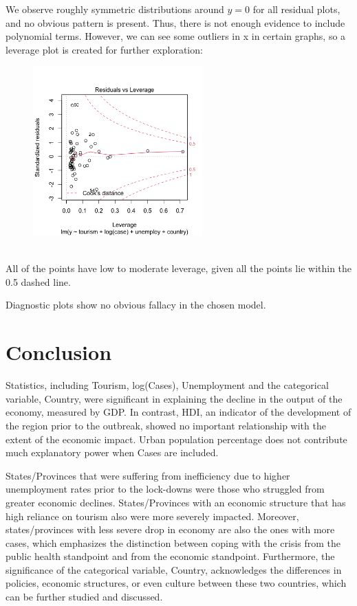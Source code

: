 \documentclass{article}
\begin{document}
We observe roughly symmetric distributions around $y = 0$ for all residual plots, and no obvious pattern is present. Thus, there is not enough evidence to include polynomial terms. However, we can see some outliers in x in certain graphs, so a leverage plot is created for further exploration:
\begin{figure}[H]
\centering
\begin{minipage}{.5\textwidth}
  \centering
  \includegraphics[width= 6.5cm]{leverage.png}
  \label{fig:leverage}
\end{minipage}%
\end{figure}\\
All of the points have low to moderate leverage, given all the points lie within the 0.5 dashed line.

Diagnostic plots show no obvious fallacy in the chosen model. 

\newpage
\maketitle
\section{Conclusion} 

Statistics, including Tourism, log(Cases), Unemployment and the categorical variable, Country, were significant in explaining the decline in the output of the economy, measured by GDP. In contrast, HDI, an indicator of the development of the region prior to the outbreak, showed no important relationship with the extent of the economic impact. Urban population percentage does not contribute much explanatory power when Cases are included. 

States/Provinces that were suffering from inefficiency due to higher unemployment rates prior to the lock-downs were those who struggled from greater economic declines. States/Provinces with an economic structure that has high reliance on tourism also were more severely impacted. Moreover, states/provinces with less severe drop in economy are also the ones with more cases, which emphasizes the distinction between coping with the crisis from the public health standpoint and from the economic standpoint. Furthermore, the significance of the categorical variable, Country, acknowledges the differences in policies, economic structures, or even culture between these two countries, which can be further studied and discussed.
\end{document}

